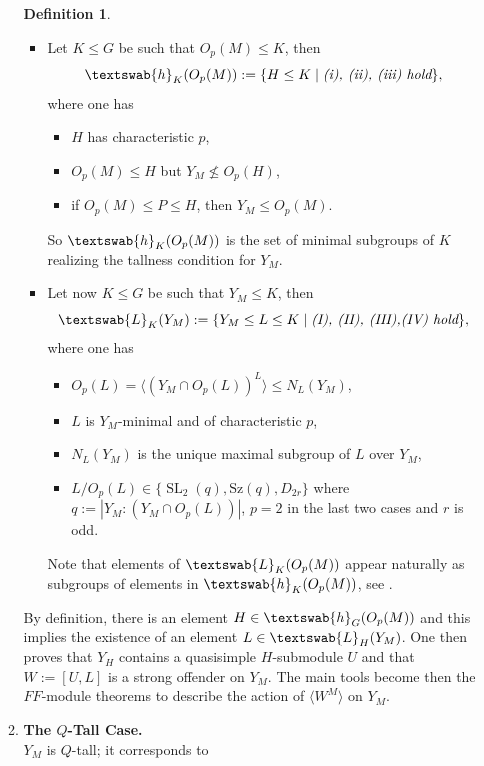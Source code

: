 \documentclass{amsart}
\numberwithin{equation}{section}
\theoremstyle{definition}
\newtheorem{definition}[equation]{Definition}
\theoremstyle{subresult}
\theoremstyle{caseresult}
\newcommand{\cL}{\textswab{L}}
\newcommand{\SL}{\operatorname{SL}}
\newcommand{\<}{\langle}
\renewcommand{\>}{\rangle}
\newcommand{\h}{\textswab{h}}
\begin{document}
\begin{enumerate}
\begin{enumerate}[label=(Asym: \alph*), itemindent=0.5cm]
		\begin{definition}\label{def:subsets of subgr fot the tall cases}
			\begin{itemize} 
			\item[1.] Let $K \le G$ be such that $O_p(M) \le K$, then 
			\[
			\h_K(O_p(M)) := \{ H \le K \mid \textit{(i), (ii), (iii) hold} \},
			\]
			where one has
			\begin{itemize}
				\item[(i)] $H$ has characteristic $p$,
				\item[(ii)] $O_p(M) \le H$ but $Y_M \not \le O_p(H)$,
				\item[(iii)] if $O_p(M) \le P \le H$, then $Y_M \le O_p(M)$.
			\end{itemize}
			So $\h_K(O_p(M))$ is the set of minimal subgroups of $K$ realizing the tallness condition for $Y_M$.
			\item[2.] Let now $K \le G$ be such that $Y_M \le K$, then 
			\[
			\cL_K(Y_M) := \{Y_M \le L \le K \mid \textit{(I), (II), (III),(IV) hold} \},
			\]
			where one has
			\begin{itemize}
				\item[(I)] $O_p(L) = \< (Y_M \cap O_p(L))^L \> \le N_L(Y_M)$,
				\item[(II)] $L$ is $Y_M$-minimal and of characteristic $p$,
				\item[(III)] $N_L(Y_M)$ is the unique maximal subgroup of $L$ over $Y_M$,
				\item[(IV)] $L / O_p(L) \in \{ \SL_2(q), \mathrm{Sz}(q), D_{2r} \}$ where $q := |Y_M : (Y_M \cap O_p(L)) |$, $p=2$ in the last two cases and $r$ is odd. 
			\end{itemize}
			Note that elements of $\cL_K(O_p(M))$ appear naturally as subgroups of elements in $\h_K(O_p(M))$, see \cite[Lemmas 2.15 and 2.16]{Meier-Stell-Stroth:2012}.
			\end{itemize} 
		\end{definition}
		By definition, there is an element $H \in \h_G(O_p(M))$ and this implies the existence of an element $L \in \cL_H(Y_M)$. One then proves that $Y_H$ contains a quasisimple $H$-submodule $U$ and that $W:=[U,L]$ is a strong offender on $Y_M$. The main tools become then the $FF$-module theorems \cite[Theorems 1, 2 and 3]{MS:2012a} to describe the action of $\<W^M \>$ on $Y_M$.
				\item {\bf The $Q$-Tall Case.}\\	
					$Y_M$ is $Q$-tall; it corresponds to
					\begin{center}

\end{center}
\end{enumerate}
\end{enumerate}
\end{document}
